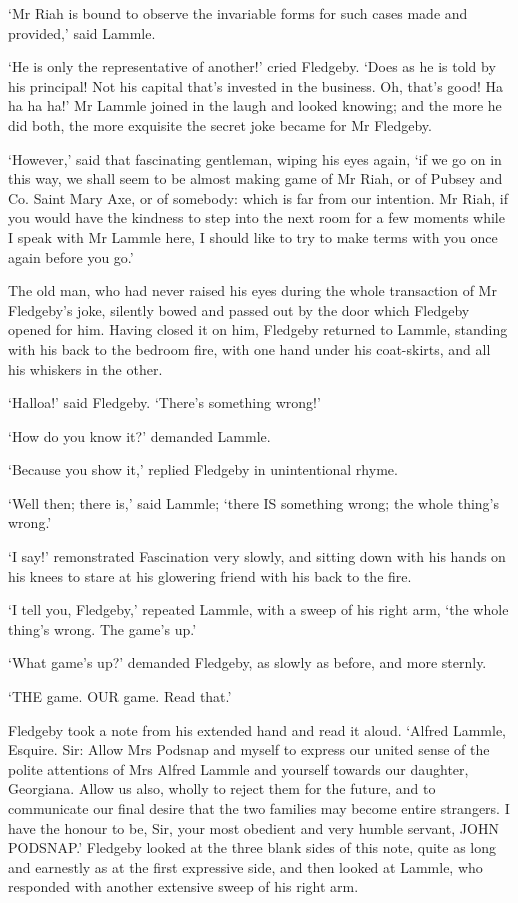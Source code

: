 ‘Mr Riah is bound to observe the invariable forms for such cases made
and provided,’ said Lammle.

‘He is only the representative of another!’ cried Fledgeby. ‘Does as
he is told by his principal! Not his capital that’s invested in the
business. Oh, that’s good! Ha ha ha ha!’ Mr Lammle joined in the laugh
and looked knowing; and the more he did both, the more exquisite the
secret joke became for Mr Fledgeby.

‘However,’ said that fascinating gentleman, wiping his eyes again, ‘if
we go on in this way, we shall seem to be almost making game of Mr Riah,
or of Pubsey and Co. Saint Mary Axe, or of somebody: which is far from
our intention. Mr Riah, if you would have the kindness to step into the
next room for a few moments while I speak with Mr Lammle here, I should
like to try to make terms with you once again before you go.’

The old man, who had never raised his eyes during the whole transaction
of Mr Fledgeby’s joke, silently bowed and passed out by the door which
Fledgeby opened for him. Having closed it on him, Fledgeby returned to
Lammle, standing with his back to the bedroom fire, with one hand under
his coat-skirts, and all his whiskers in the other.

‘Halloa!’ said Fledgeby. ‘There’s something wrong!’

‘How do you know it?’ demanded Lammle.

‘Because you show it,’ replied Fledgeby in unintentional rhyme.

‘Well then; there is,’ said Lammle; ‘there IS something wrong; the whole
thing’s wrong.’

‘I say!’ remonstrated Fascination very slowly, and sitting down with his
hands on his knees to stare at his glowering friend with his back to the
fire.

‘I tell you, Fledgeby,’ repeated Lammle, with a sweep of his right arm,
‘the whole thing’s wrong. The game’s up.’

‘What game’s up?’ demanded Fledgeby, as slowly as before, and more
sternly.

‘THE game. OUR game. Read that.’

Fledgeby took a note from his extended hand and read it aloud. ‘Alfred
Lammle, Esquire. Sir: Allow Mrs Podsnap and myself to express our united
sense of the polite attentions of Mrs Alfred Lammle and yourself towards
our daughter, Georgiana. Allow us also, wholly to reject them for the
future, and to communicate our final desire that the two families
may become entire strangers. I have the honour to be, Sir, your most
obedient and very humble servant, JOHN PODSNAP.’ Fledgeby looked at the
three blank sides of this note, quite as long and earnestly as at the
first expressive side, and then looked at Lammle, who responded with
another extensive sweep of his right arm.

